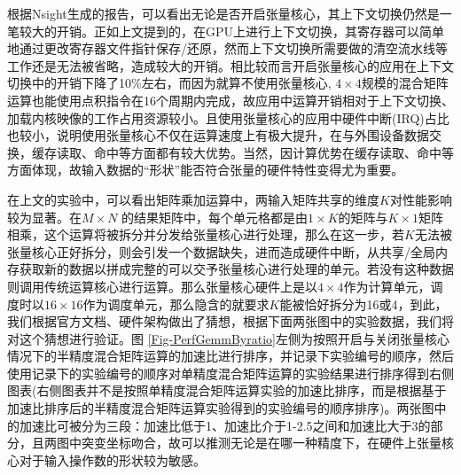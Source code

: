 \par 根据Nsight生成的报告，可以看出无论是否开启张量核心，其上下文切换仍然是一笔较大的开销。正如上文提到的，在GPU上进行上下文切换，其寄存器可以简单地通过更改寄存器文件指针保存/还原，然而上下文切换所需要做的清空流水线等工作还是无法被省略，造成较大的开销。相比较而言开启张量核心的应用在上下文切换中的开销下降了10\%左右，而因为就算不使用张量核心, $ 4\times4 $规模的混合矩阵运算也能使用点积指令在16个周期内完成，故应用中运算开销相对于上下文切换、加载内核映像的工作占用资源较小。且使用张量核心的应用中硬件中断(IRQ)占比也较小，说明使用张量核心不仅在运算速度上有极大提升，在与外围设备数据交换，缓存读取、命中等方面都有较大优势。当然，因计算优势在缓存读取、命中等方面体现，故输入数据的“形状”能否符合张量的硬件特性变得尤为重要。
\par 在上文的实验中，可以看出矩阵乘加运算中，两输入矩阵共享的维度$ K $对性能影响较为显著。在$ M\times N$ 的结果矩阵中，每个单元格都是由$ 1\times K $的矩阵与$ K\times 1 $矩阵相乘，这个运算将被拆分并分发给张量核心进行处理，那么在这一步，若$ K $无法被张量核心正好拆分，则会引发一个数据缺失，进而造成硬件中断，从共享/全局内存获取新的数据以拼成完整的可以交予张量核心进行处理的单元。若没有这种数据则调用传统运算核心进行运算。那么张量核心硬件上是以$ 4\times 4 $作为计算单元，调度时以$ 16\times 16 $作为调度单元，那么隐含的就要求$ K $能被恰好拆分为16或4，到此，我们根据官方文档、硬件架构做出了猜想，根据下面两张图中的实验数据，我们将对这个猜想进行验证。图 \ref{Fig-PerfGemmByratio}左侧为按照开启与关闭张量核心情况下的半精度混合矩阵运算的加速比进行排序，并记录下实验编号的顺序，然后使用记录下的实验编号的顺序对单精度混合矩阵运算的实验结果进行排序得到右侧图表(右侧图表并不是按照单精度混合矩阵运算实验的加速比排序，而是根据基于加速比排序后的半精度混合矩阵运算实验得到的实验编号的顺序排序)。两张图中的加速比可被分为三段：加速比低于1、加速比介于1-2.5之间和加速比大于3的部分，且两图中突变坐标吻合，故可以推测无论是在哪一种精度下，在硬件上张量核心对于输入操作数的形状较为敏感。
